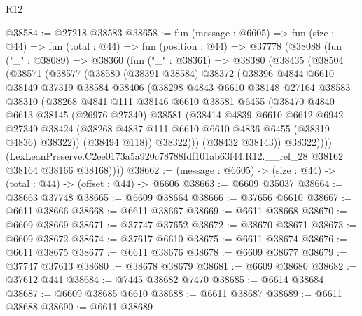 \begin{lexlean}{R12}
\begin{coremodule}
@38584 := @27218 @38583
@38658 := fun (message : @6605) =>
  fun (size : @44) =>
  fun (total : @44) =>
  fun (position : @44) =>
  @37778
    (@38088
      (fun ("_" : @38089) =>
      @38360
        (fun ("_" : @38361) =>
        @38380
          (@38435
            (@38504
              (@38571
                (@38577
                  (@38580
                    (@38391 @38584)
                    @38372
                    (@38396
                      @4844
                      @6610
                      @38149
                      @37319
                      @38584
                      @38406
                      (@38298
                        @4843
                        @6610
                        @38148
                        @27164
                        @38583
                        @38310
                        (@38268
                          @4841
                          @111
                          @38146
                          @6610
                          @38581
                          @6455
                          (@38470
                            @4840
                            @6613
                            @38145
                            (@26976 @27349)
                            @38581
                            (@38414
                              @4839
                              @6610
                              @6612
                              @6942
                              @27349
                              @38424
                              (@38268 @4837 @111 @6610 @6610 @4836 @6455 (@38319 @4836) @38322))
                            (@38494 @118))
                          @38322)))
                    (@38432 @38143))
                  @38322))))
          (LexLeanPreserve.C2ee0173a5a920c78788fdf101ab63f44.R12.__rel_28
            @38162
            @38164
            @38166
            @38168))))
@38662 := (message : @6605) -> (size : @44) -> (total : @44) -> (offset : @44) -> @6606
@38663 := @6609 @35037
@38664 := @38663 @37748
@38665 := @6609 @38664
@38666 := @37656 @6610
@38667 := @6611 @38666
@38668 := @6611 @38667
@38669 := @6611 @38668
@38670 := @6609 @38669
@38671 := @37747 @37652
@38672 := @38670 @38671
@38673 := @6609 @38672
@38674 := @37617 @6610
@38675 := @6611 @38674
@38676 := @6611 @38675
@38677 := @6611 @38676
@38678 := @6609 @38677
@38679 := @37747 @37613
@38680 := @38678 @38679
@38681 := @6609 @38680
@38682 := @37612 @441
@38684 := @7445 @38682 @7470
@38685 := @6614 @38684
@38687 := @6609 @38685 @6610
@38688 := @6611 @38687
@38689 := @6611 @38688
@38690 := @6611 @38689

\end{coremodule}
\end{lexlean}
